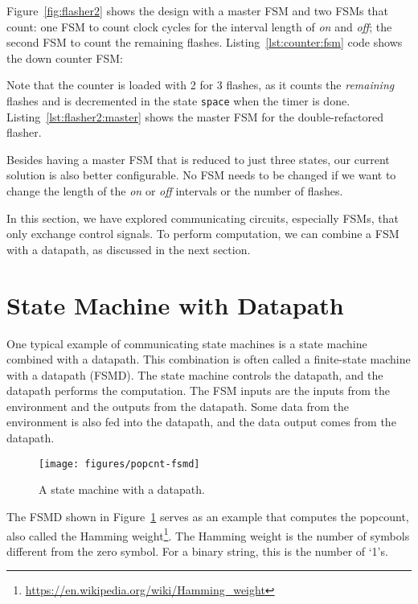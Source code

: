 \documentclass[%
    10pt,
    headinclude, footexclude,
    openright, %
    notitlepage,
    cleardoubleempty,
    headsepline,
    pointlessnumbers,
    bibtotoc, idxtotoc,
    ]{scrbook}
\newcommand{\scale}{0.7}
\newcommand{\code}[1]{{\lstinline[basicstyle=\small\ttfamily]{#1}}}
\newcommand{\myref}[2]{\href{#1}{#2}}
\renewcommand{\myref}[2]{{#2}{\footnote{\url{#1}}}}
\begin{document}
Figure~\ref{fig:flasher2} shows the design with a master FSM and two FSMs
that count: one FSM to count clock cycles for the interval length of \emph{on}
and \emph{off}; the second FSM to count the remaining flashes.
Listing~\ref{lst:counter:fsm} code shows the down counter FSM:



\noindent Note that the counter is loaded with 2 for 3 flashes, as it counts the
\emph{remaining} flashes and is decremented in the state \code{space} when the timer
is done. Listing~\ref{lst:flasher2:master} shows the master FSM for the double-refactored flasher.


Besides having a master FSM that is reduced to just three states, our current solution
is also better configurable. No FSM needs to be changed if we want to change
the length of the \emph{on} or \emph{off} intervals or the number of flashes.

In this section, we have explored communicating circuits, especially FSMs, that
only exchange control signals. To perform computation, we can combine a FSM with
a datapath, as discussed in the next section.

\section{State Machine with Datapath}
\label{sec:fsmd}

One typical example of communicating state machines is a state machine
combined with a datapath. This combination is often called a finite-state machine
with a datapath (FSMD). The state machine controls the datapath, and the datapath
performs the computation. The FSM inputs are the inputs from the environment and the outputs
from the datapath. Some data from the environment is also fed into the datapath, and the
data output comes from the datapath.

\begin{figure}
  \centering
  \texttt{[image: figures/popcnt-fsmd]}
  \caption{A state machine with a datapath.}
  \label{fig:popcnt-fsmd}
\end{figure}

The FSMD shown in Figure~\ref{fig:popcnt-fsmd} serves as an example that computes the
popcount, also called the \myref{https://en.wikipedia.org/wiki/Hamming_weight}{Hamming weight}.
The Hamming weight is the number of symbols different from the zero symbol.
For a binary string, this is the number of `1's.
\end{document}

